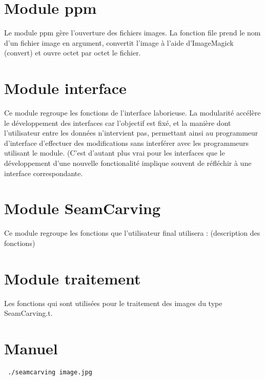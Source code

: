 \documentclass[a4paper]{article}
\begin{document}
\section{Module ppm}

Le module ppm gère l'ouverture des fichiers images. La fonction file 
prend le nom d'un fichier image en argument, convertit l'image à l'aide
d'ImageMagick (convert) et ouvre octet par octet le fichier.


\section {Module interface}

Ce module regroupe les fonctions de l'interface laborieuse. La modularité
accélère le développement des interfaces car l'objectif est fixé, et la 
manière dont l'utilisateur entre les données n'intervient pas, permettant 
ainsi au programmeur d'interface d'effectuer des modifications sans 
interférer avec les programmeurs utilisant le module. (C'est d'autant plus
vrai pour les interfaces que le développement d'une nouvelle fonctionalité
implique souvent de réfléchir à une interface correspondante.

\section {Module SeamCarving}

Ce module regroupe les fonctions que l'utilisateur final utilisera :
(description des fonctions)

\section {Module traitement}

Les fonctions qui sont utilisées pour le traitement des images du 
type SeamCarving.t.

\section {Manuel}

\begin{verbatim} ./seamcarving image.jpg\end{verbatim}
\end{document}
